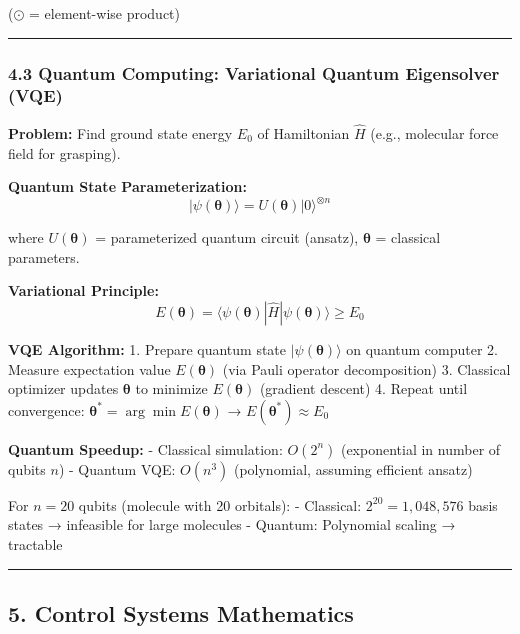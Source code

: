 \documentclass[
]{article}
\begin{document}
(\(\odot\) = element-wise product)

\begin{center}\rule{0.5\linewidth}{0.5pt}\end{center}

\hypertarget{quantum-computing-variational-quantum-eigensolver-vqe}{%
\subsubsection{4.3 Quantum Computing: Variational Quantum Eigensolver
(VQE)}\label{quantum-computing-variational-quantum-eigensolver-vqe}}

\textbf{Problem:} Find ground state energy \(E_0\) of Hamiltonian
\(\hat{H}\) (e.g., molecular force field for grasping).

\textbf{Quantum State Parameterization:} \[
|\psi(\boldsymbol{\theta})\rangle = U(\boldsymbol{\theta}) |0\rangle^{\otimes n}
\]

where \(U(\boldsymbol{\theta})\) = parameterized quantum circuit
(ansatz), \(\boldsymbol{\theta}\) = classical parameters.

\textbf{Variational Principle:} \[
E(\boldsymbol{\theta}) = \langle \psi(\boldsymbol{\theta}) | \hat{H} | \psi(\boldsymbol{\theta}) \rangle \geq E_0
\]

\textbf{VQE Algorithm:} 1. Prepare quantum state
\(|\psi(\boldsymbol{\theta})\rangle\) on quantum computer 2. Measure
expectation value \(E(\boldsymbol{\theta})\) (via Pauli operator
decomposition) 3. Classical optimizer updates \(\boldsymbol{\theta}\) to
minimize \(E(\boldsymbol{\theta})\) (gradient descent) 4. Repeat until
convergence: \(\boldsymbol{\theta}^* = \arg\min E(\boldsymbol{\theta})\)
→ \(E(\boldsymbol{\theta}^*) \approx E_0\)

\textbf{Quantum Speedup:} - Classical simulation: \(O(2^n)\)
(exponential in number of qubits \(n\)) - Quantum VQE: \(O(n^3)\)
(polynomial, assuming efficient ansatz)

For \(n = 20\) qubits (molecule with 20 orbitals): - Classical:
\(2^{20} = 1,048,576\) basis states → infeasible for large molecules -
Quantum: Polynomial scaling → tractable

\begin{center}\rule{0.5\linewidth}{0.5pt}\end{center}

\hypertarget{control-systems-mathematics}{%
\subsection{5. Control Systems
Mathematics}\label{control-systems-mathematics}}
\end{document}
